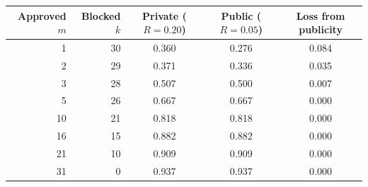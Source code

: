 \begin{tabular}{rrccc}\toprule
Approved $m$ & Blocked $k$ & Private ($R=0.20$) & Public ($R=0.05$) & Loss from publicity\\\midrule
1 & 30 & 0.360 & 0.276 & 0.084\\
2 & 29 & 0.371 & 0.336 & 0.035\\
3 & 28 & 0.507 & 0.500 & 0.007\\
5 & 26 & 0.667 & 0.667 & 0.000\\
10 & 21 & 0.818 & 0.818 & 0.000\\
16 & 15 & 0.882 & 0.882 & 0.000\\
21 & 10 & 0.909 & 0.909 & 0.000\\
31 & 0 & 0.937 & 0.937 & 0.000\\
\bottomrule\end{tabular}